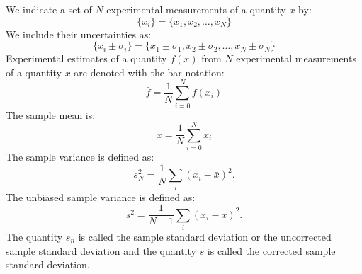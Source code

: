 \documentclass[12pt,oneside]{book}
\begin{document}
We indicate a set of $N$ experimental measurements of a quantity $x$ by:
\begin{displaymath}
\{x_i\} =   \{x_1, x_2, \dots , x_N \}
\end{displaymath}
We include their uncertainties as:
\begin{displaymath}
\{x_i \pm \sigma_i\} =   \{x_1 \pm \sigma_1, x_2 \pm \sigma_2, \dots , x_N \pm \sigma_N \}
\end{displaymath}
Experimental estimates of a quantity $f(x)$ from $N$ experimental measurements of a quantity $x$ are denoted with the bar notation:
\begin{displaymath}
  \bar{f} = \frac{1}{N} \sum_{i=0}^N f(x_i)
\end{displaymath}
The sample mean is:
\begin{displaymath}
  \bar{x} = \frac{1}{N} \sum_{i=0}^N x_i
\end{displaymath}
The sample variance is defined as:
\begin{displaymath}
s_N^2  = \frac{1}{N} \sum_i (x_i-\bar{x})^2.
\end{displaymath}
The unbiased sample variance is defined as:
\begin{displaymath}
\label{eqn:sampvar}
s^2  = \frac{1}{N-1} \sum_i (x_i-\bar{x})^2.
\end{displaymath}
The quantity $s_n$ is called the sample standard deviation or the
uncorrected sample standard deviation and the quantity $s$ is called
the corrected sample standard deviation.  
\end{document}
